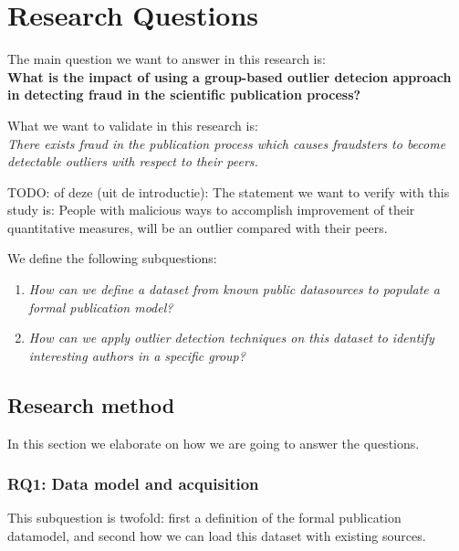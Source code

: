\documentclass{ou-report}
\newcommand{\todo}[1]{{\color{red} TODO: #1}}
\begin{document}
\section{Research Questions}

The main question we want to answer in this research is: \\
\textbf{What is the impact of using a group-based outlier detecion approach in 
detecting fraud in the scientific publication process?}

What we want to validate in this research is: \\
\textit{There exists fraud in the publication process which causes fraudsters
to become detectable outliers with respect to their peers.}

\todo{of deze (uit de introductie):}
The statement we want to verify with this study is:
People with malicious ways to accomplish improvement of their quantitative 
measures, will be an outlier compared with their peers.

We define the following subquestions:

\begin{enumerate}[label=RQ\arabic*]

    \item \label{RQ1} \textit{How can we define a dataset from known public 
    datasources to populate a formal publication model?}
    \item \label{RQ2} \textit{How can we apply outlier detection techniques on this 
    dataset to identify interesting authors in a specific group?}

\end{enumerate}

\subsection{Research method}
\label{Research_ResearchMethod}
In this section we elaborate on how we are going to answer the questions.

\subsubsection*{RQ1: Data model and acquisition}
This subquestion is twofold: first a definition of the formal publication datamodel, 
and second how we can load this dataset with existing sources.
\end{document}
